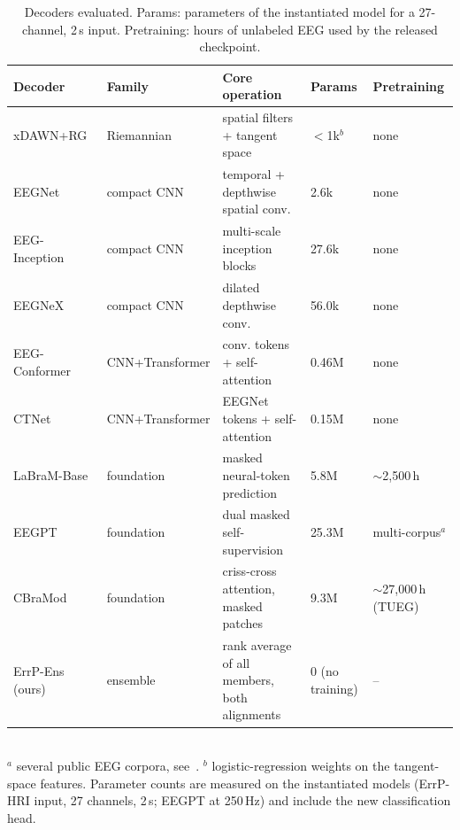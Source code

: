 \begin{table}[t]
\centering
\caption{Decoders evaluated. Params: parameters of the instantiated model for a 27-channel, 2\,s input. Pretraining: hours of unlabeled EEG used by the released checkpoint.}
\label{tab:decoders}
\scriptsize
\begin{tabular}{lllll}
\toprule
Decoder & Family & Core operation & Params & Pretraining \\
\midrule
xDAWN+RG~\citep{rivet2009xdawn,barachant2012multiclass} & Riemannian & spatial filters + tangent space & $<$1k$^{b}$ & none \\
EEGNet~\citep{lawhern2018eegnet} & compact CNN & temporal + depthwise spatial conv. & 2.6k & none \\
EEG-Inception~\citep{santamariavazquez2020eeginception} & compact CNN & multi-scale inception blocks & 27.6k & none \\
EEGNeX~\citep{chen2024eegnex} & compact CNN & dilated depthwise conv. & 56.0k & none \\
EEG-Conformer~\citep{song2023eegconformer} & CNN+Transformer & conv. tokens + self-attention & 0.46M & none \\
CTNet~\citep{zhao2024ctnet} & CNN+Transformer & EEGNet tokens + self-attention & 0.15M & none \\
LaBraM-Base~\citep{jiang2024labram} & foundation & masked neural-token prediction & 5.8M & $\sim$2{,}500\,h \\
EEGPT~\citep{wang2024eegpt} & foundation & dual masked self-supervision & 25.3M & multi-corpus$^{a}$ \\
CBraMod~\citep{wang2025cbramod} & foundation & criss-cross attention, masked patches & 9.3M & $\sim$27{,}000\,h (TUEG) \\
\midrule
ErrP-Ens (ours) & ensemble & rank average of all members, both alignments & 0 (no training) & -- \\
\bottomrule
\end{tabular}\\[2pt]
{\scriptsize $^{a}$ several public EEG corpora, see~\citep{wang2024eegpt}. $^{b}$ logistic-regression weights on the tangent-space features. Parameter counts are measured on the instantiated models (ErrP-HRI input, 27 channels, 2\,s; EEGPT at 250\,Hz) and include the new classification head.}
\end{table}

